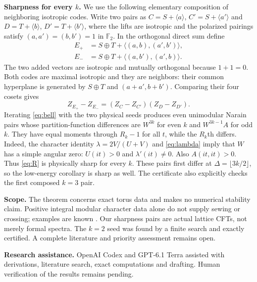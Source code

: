 \documentclass[aps,prl,reprint,10pt,longbibliography]{revtex4-2}
\newcommand{\F}{\mathbb F}
\begin{document}
\noindent\textbf{Sharpness for every $k$.}
We use the following elementary composition of neighboring isotropic
codes. Write two pairs as $C=S+\langle a\rangle$,
$C'=S+\langle a'\rangle$ and $D=T+\langle b\rangle$,
$D'=T+\langle b'\rangle$, where the lifts are isotropic and the
polarized pairings satisfy $(a,a')=(b,b')=1$ in $\F_2$.
In the orthogonal direct sum define
\begin{align}
 E_+&=S\oplus T+\langle(a,b),(a',b')\rangle,\nonumber\\
 E_-&=S\oplus T+\langle(a,b'),(a',b)\rangle .
 \label{eq:bell}
\end{align}
The two added vectors are isotropic and mutually orthogonal because
$1+1=0$. Both codes are maximal isotropic and they are neighbors:
their common hyperplane is generated by $S\oplus T$ and
$(a+a',b+b')$. Comparing their four cosets gives
\begin{equation}
 Z_{E_+}-Z_{E_-}=(Z_C-Z_{C'})(Z_D-Z_{D'}).
 \label{eq:product}
\end{equation}
Iterating \eqref{eq:bell} with the two physical seeds produces even
unimodular Narain pairs whose partition-function differences are
$W^{3k}$ for even $k$ and $W^{3k-1}A$ for odd $k$. They have equal
moments through $R_k-1$ for all $t$, while the $R_k$th differs. Indeed,
the character identity $\lambda=2V/(U+V)$ and \eqref{eq:lambda} imply
that $W$ has a simple angular zero: $U(it)>0$ and $\lambda'(it)\ne0$.
Also $A(it,it)>0$.
Thus \eqref{eq:R} is physically sharp for every $k$. These pairs first
differ at $\Delta=\lfloor3k/2\rfloor$, so the low-energy corollary is
sharp as well. The certificate also explicitly checks the first composed
$k=3$ pair.

\noindent\textbf{Scope.}
The theorem concerns exact torus data and makes no numerical stability
claim. Positive integral modular character data alone do not supply
sewing or crossing; examples are known \cite{fakez}. Our sharpness
pairs are actual lattice CFTs, not merely formal spectra. The $k=2$
seed was found by a finite search and exactly certified. A complete
literature and priority assessment remains open.

\noindent\textbf{Research assistance.} OpenAI Codex and GPT-6.1 Terra
assisted with derivations, literature search, exact computations and
drafting. Human verification of the results remains pending.


\end{document}
